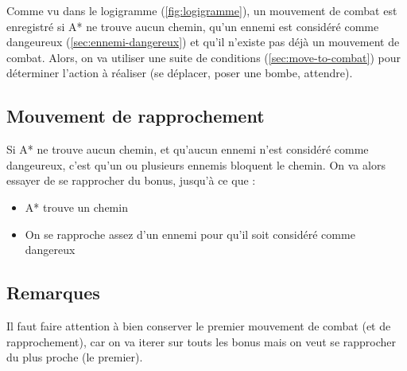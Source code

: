 Comme vu dans le logigramme (\autoref{fig:logigramme}), un mouvement de combat est enregistré si A* ne trouve aucun chemin, qu'un ennemi est considéré comme dangeureux (\autoref{sec:ennemi-dangereux}) et qu'il n'existe pas déjà un mouvement de combat.
Alors, on va utiliser une suite de conditions (\autoref{sec:move-to-combat}) pour déterminer l'action à réaliser (se déplacer, poser une bombe, attendre).

\subsection{Mouvement de rapprochement}

Si A* ne trouve aucun chemin, et qu'aucun ennemi n'est considéré comme dangeureux, c'est qu'un ou plusieurs ennemis bloquent le chemin.
On va alors essayer de se rapprocher du bonus, jusqu'à ce que : 
\begin{itemize}
    \item A* trouve un chemin
    \item On se rapproche assez d'un ennemi pour qu'il soit considéré comme dangereux
\end{itemize}

\subsection{Remarques}

Il faut faire attention à bien conserver le premier mouvement de combat (et de rapprochement), car on va iterer sur touts les bonus mais on veut se rapprocher du plus proche (le premier). 
